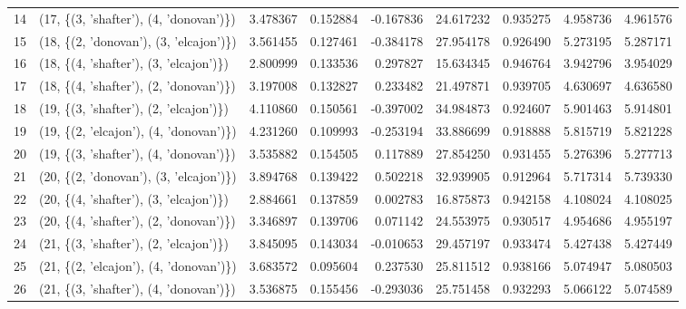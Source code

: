 \begin{tabular}{llrrrrrrr}
14 &  (17, \{(3, 'shafter'), (4, 'donovan')\}) &  3.478367 &  0.152884 & -0.167836 &  24.617232 &  0.935275 &  4.958736 &  4.961576 \\
15 &  (18, \{(2, 'donovan'), (3, 'elcajon')\}) &  3.561455 &  0.127461 & -0.384178 &  27.954178 &  0.926490 &  5.273195 &  5.287171 \\
16 &  (18, \{(4, 'shafter'), (3, 'elcajon')\}) &  2.800999 &  0.133536 &  0.297827 &  15.634345 &  0.946764 &  3.942796 &  3.954029 \\
17 &  (18, \{(4, 'shafter'), (2, 'donovan')\}) &  3.197008 &  0.132827 &  0.233482 &  21.497871 &  0.939705 &  4.630697 &  4.636580 \\
18 &  (19, \{(3, 'shafter'), (2, 'elcajon')\}) &  4.110860 &  0.150561 & -0.397002 &  34.984873 &  0.924607 &  5.901463 &  5.914801 \\
19 &  (19, \{(2, 'elcajon'), (4, 'donovan')\}) &  4.231260 &  0.109993 & -0.253194 &  33.886699 &  0.918888 &  5.815719 &  5.821228 \\
20 &  (19, \{(3, 'shafter'), (4, 'donovan')\}) &  3.535882 &  0.154505 &  0.117889 &  27.854250 &  0.931455 &  5.276396 &  5.277713 \\
21 &  (20, \{(2, 'donovan'), (3, 'elcajon')\}) &  3.894768 &  0.139422 &  0.502218 &  32.939905 &  0.912964 &  5.717314 &  5.739330 \\
22 &  (20, \{(4, 'shafter'), (3, 'elcajon')\}) &  2.884661 &  0.137859 &  0.002783 &  16.875873 &  0.942158 &  4.108024 &  4.108025 \\
23 &  (20, \{(4, 'shafter'), (2, 'donovan')\}) &  3.346897 &  0.139706 &  0.071142 &  24.553975 &  0.930517 &  4.954686 &  4.955197 \\
24 &  (21, \{(3, 'shafter'), (2, 'elcajon')\}) &  3.845095 &  0.143034 & -0.010653 &  29.457197 &  0.933474 &  5.427438 &  5.427449 \\
25 &  (21, \{(2, 'elcajon'), (4, 'donovan')\}) &  3.683572 &  0.095604 &  0.237530 &  25.811512 &  0.938166 &  5.074947 &  5.080503 \\
26 &  (21, \{(3, 'shafter'), (4, 'donovan')\}) &  3.536875 &  0.155456 & -0.293036 &  25.751458 &  0.932293 &  5.066122 &  5.074589 \\
\bottomrule
\end{tabular}
